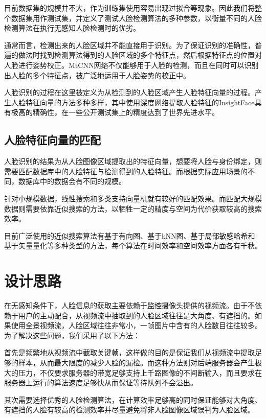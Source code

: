 目前数据集的规模并不大，作为训练集使用容易出现过拟合等现象。因此我们将整个数据集用作测试集，并定义了测试人脸检测算法的多种参数，以衡量不同的人脸检测算法在执行无感知人脸检测时的优劣。

通常而言，检测出来的人脸区域并不能直接用于识别。为了保证识别的准确性，普遍的做法时找到检测算法得到的人脸区域的多个特征点，然后根据特征点的位置对人脸进行姿势校正。MtCNN网络\cite{zhang2016joint}不仅能够用于人脸的检测，而且在同时可以识别出人脸的多个特征点，被广泛地运用于人脸姿势的校正中。

人脸识别的过程在这里被定义为从检测到的人脸区域产生人脸特征向量的过程。产生人脸特征向量的方法多种多样，其中使用深度网络提取人脸特征的InsightFace\cite{deng2018arcface}具有极高的精确性，在一些公开测试集上的精度达到了世界先进水平。

\subsection{人脸特征向量的匹配}

人脸识别的结果为从人脸图像区域提取出的特征向量，想要将人脸与身份绑定，则需要匹配数据库中的人脸特征与检测得到的人脸特征。而根据实际应用场景的不同，数据库中的数据会有不同的规模。

针对小规模数据，线性搜索和多类支持向量机就有较好的匹配效果。而匹配大规模数据则需要依靠近似搜索的方法，以牺牲一定的精度与空间为代价获取较高的搜索效率。

目前广泛使用的近似搜索算法有基于有向图、基于kNN图、基于局部敏感哈希和基于矢量量化等多种类型的方法，每个算法在时间效率和空间效率方面各有千秋。

\section{设计思路}

在无感知条件下，人脸信息的获取主要依赖于监控摄像头提供的视频流。由于不依赖于用户的主动配合，从视频流中抽取到的人脸区域往往是大角度、有遮挡的。如果使用全景视频流，人脸区域往往非常小，一帧图片中含有的人脸数目往往较多。为了解决这些问题，我们采用了以下方法：

首先是频繁地从视频流中截取关键帧，这样做的目的是保证我们从视频流中提取足够的样本，从而最大限度的减少人脸的漏检。而这种方法则对后端服务器会产生极大的压力，不仅要求服务器的带宽足够支持上千路图像的不间断输入，而且要求在服务器上运行的算法速度足够快从而保证等待队列不会溢出。

其次需要选择优秀的人脸检测算法，在计算效率足够高的同时保证能够对大角度、有遮挡的人脸有较高的检测效率并尽量避免将非人脸图像区域误判为人脸区域。

